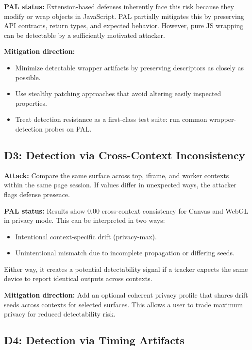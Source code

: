 \documentclass[11pt]{report}
\begin{document}
\textbf{PAL status:} Extension-based defenses inherently face this risk because they modify or wrap objects in JavaScript. PAL partially mitigates this by preserving API contracts, return types, and expected behavior. However, pure JS wrapping can be detectable by a sufficiently motivated attacker.

\textbf{Mitigation direction:}
\begin{itemize}
    \item Minimize detectable wrapper artifacts by preserving descriptors as closely as possible.
    \item Use stealthy patching approaches that avoid altering easily inspected properties.
    \item Treat detection resistance as a first-class test suite: run common wrapper-detection probes on PAL.
\end{itemize}

\subsection{D3: Detection via Cross-Context Inconsistency}

\textbf{Attack:} Compare the same surface across top, iframe, and worker contexts within the same page session. If values differ in unexpected ways, the attacker flags defense presence.

\textbf{PAL status:} Results show $0.00$ cross-context consistency for Canvas and WebGL in privacy mode. This can be interpreted in two ways:

\begin{itemize}
    \item Intentional context-specific drift (privacy-max).
    \item Unintentional mismatch due to incomplete propagation or differing seeds.
\end{itemize}

Either way, it creates a potential detectability signal if a tracker expects the same device to report identical outputs across contexts.

\textbf{Mitigation direction:} Add an optional coherent privacy profile that shares drift seeds across contexts for selected surfaces. This allows a user to trade maximum privacy for reduced detectability risk.

\subsection{D4: Detection via Timing Artifacts}
\end{document}
